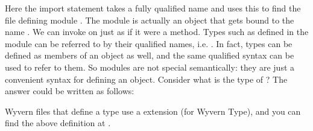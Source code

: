 \documentclass{article}
\begin{document}
\begin{mdP}[data-line={310}]%
{}Here the import statement takes a fully qualified name and uses this to
find the file defining module %
{}%
{}.  The module is actually an object
that gets bound to the name %
{}%
{}.  We can invoke %
{}%
{} on %
{}%
{}
just as if it were a method.  Types such as %
{}%
{} defined in the %
{}%
{}
module can be referred to by their qualified names, i.e. %
{}%
{}.
In fact, types can be defined as members of an object as well, and the
same qualified syntax can be used to refer to them.  So modules are not
special semantically: they are just a convenient syntax for defining an
object.  Consider what is the type of %
{}%
{}?  The answer could be
written as follows:%
\end{mdP}%
\begin{mdPre}[class={para-block,pre-indented},data-line={321}]%
%
\end{mdPre}%
\begin{mdP}[data-line={328}]%
{}Wyvern files that define a type use a %
{}%
{} extension (for Wyvern Type),
and you can find the above definition at %
{}%
{}.%
\end{mdP}%
\end{document}

